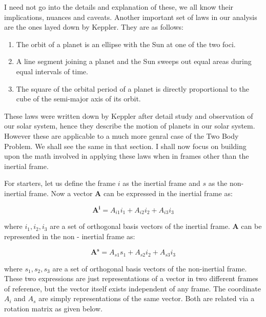 \documentclass[12pt, letterpaper]{article}
\begin{document}
I need not go into the details and explanation of these, we all know their implications, nuances and caveats. Another important set of laws in our analysis are the ones layed down by Keppler. They are as follows:
\begin{enumerate}

	\item The orbit of a planet is an ellipse with the Sun at one of the two foci.
	\item A line segment joining a planet and the Sun sweeps out equal areas during equal intervals of time.
	\item The square of the orbital period of a planet is directly proportional to the cube of the semi-major axis of its orbit.

\end{enumerate}

 These laws were written down by Keppler after detail study and observation of our solar system, hence they describe the motion of planets in our solar system. However these are applicable to a much more genral case of the Two Body Problem. We shall see the same in that section. I shall now focus on building upon the math involved in applying these laws when in frames other than the inertial frame.

For starters, let us define the frame $i$ as the inertial frame and $s$ as the non-inertial frame. Now a vector $\mathbf{A}$ can be expressed in the inertial frame as:

\begin{displaymath} \mathbf{A^i} = A_{i1}i_1 + A_{i2}i_2 + A_{i3}i_3 \end{displaymath}
 
 where $i_1, i_2, i_3$ are a set of orthogonal basis vectors of the inertial frame. $\mathbf{A}$ can be represented in 
 the non - inertial frame as:

\begin{displaymath} \mathbf{A^s} = A_{s1}s_1 + A_{s2}i_2 + A_{s3}i_3 \end{displaymath}

where $s_1, s_2, s_3$ are a set of orthogonal basis vectors of the non-inertial frame. These two expressions are just representations of a vector in two different frames of reference, but the vector itself exists independent of any frame. The coordinate $A_i$ and $A_s$ are simply representations of the same vector. Both are related via a rotation matrix as given below. 
\end{document}
